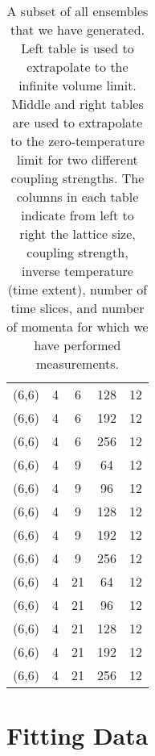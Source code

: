 \begin{table}[!htb]
\begin{tabular}[t]{ccccc}
      (6,6) & 4 & 6 & 128 & 12
      \\
      (6,6) & 4 & 6 & 192 & 12
      \\
      (6,6) & 4 & 6 & 256 & 12
      \\
      \hline
      (6,6) & 4 & 9 & 64 & 12
      \\
      (6,6) & 4 & 9 & 96 & 12
      \\
      (6,6) & 4 & 9 & 128 & 12
      \\
      (6,6) & 4 & 9 & 192 & 12
      \\
      (6,6) & 4 & 9 & 256 & 12
      \\
      \hline
      (6,6) & 4 & 21 & 64 & 12
      \\
      (6,6) & 4 & 21 & 96 & 12
      \\
      (6,6) & 4 & 21 & 128 & 12
      \\
      (6,6) & 4 & 21 & 192 & 12
      \\
      (6,6) & 4 & 21 & 256 & 12
      \\
      \hline
  \end{tabular}
    \caption{A subset of all ensembles that we have generated. Left table is used to extrapolate to the infinite volume limit. Middle and right tables are used to extrapolate to the zero-temperature limit for two different coupling strengths. The columns in each table indicate from left to right the lattice size, coupling strength, inverse temperature (time extent), number of time slices, and number of momenta for which we have performed measurements.}
    \label{tab:work_ensembles}
  \end{table}

\section{Fitting Data}


